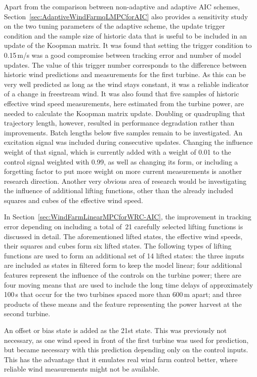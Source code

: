 Apart from the comparison between non-adaptive and adaptive AIC schemes, Section~\ref{sec:AdaptiveWindFarmqLMPCforAIC} also provides a sensitivity study on the two tuning parameters of the adaptive scheme, the update trigger condition and the sample size of historic data that is useful to be included in an update of the Koopman matrix. It was found that setting the trigger condition to 0.15\,m/s was a good compromise between tracking error and number of model updates. The value of this trigger number corresponds to the difference between historic wind predictions and measurements for the first turbine. As this can be very well predicted as long as the wind stays constant, it was a reliable indicator of a change in freestream wind. It was also found that five samples of historic effective wind speed measurements, here estimated from the turbine power, are needed to calculate the Koopman matrix update. Doubling or quadrupling that trajectory length, however, resulted in performance degradation rather than improvements. Batch lengths below five samples remain to be investigated. An excitation signal was included during consecutive updates. Changing the influence weight of that signal, which is currently added with a weight of 0.01 to the control signal weighted with 0.99, as well as changing its form, or including a forgetting factor to put more weight on more current measurements is another research direction. Another very obvious area of research would be investigating the influence of additional lifting functions, other than the already included squares and cubes of the effective wind speed.


In Section~\ref{sec:WindFarmLinearMPCforWRC-AIC}, the improvement in tracking error depending on including a total of~21 carefully selected lifting functions is discussed in detail. The aforementioned lifted states, the effective wind speeds, their squares and cubes form six lifted states. The following types of lifting functions are used to form an additional set of 14 lifted states: the three inputs are included as states in filtered form to keep the model linear; four additional features represent the influence of the controls on the turbine power; there are four moving means that are used to include the long time delays of approximately 100\,s that occur for the two turbines spaced more than 600\,m apart; and three products of these means and the feature representing the power harvest at the second turbine.

An offset or bias state is added as the 21st state. This was previously not necessary, as one wind speed in front of the first turbine was used for prediction, but became necessary with this prediction depending only on the control inputs. This has the advantage that it emulates real wind farm control better, where reliable wind measurements might not be available. 


